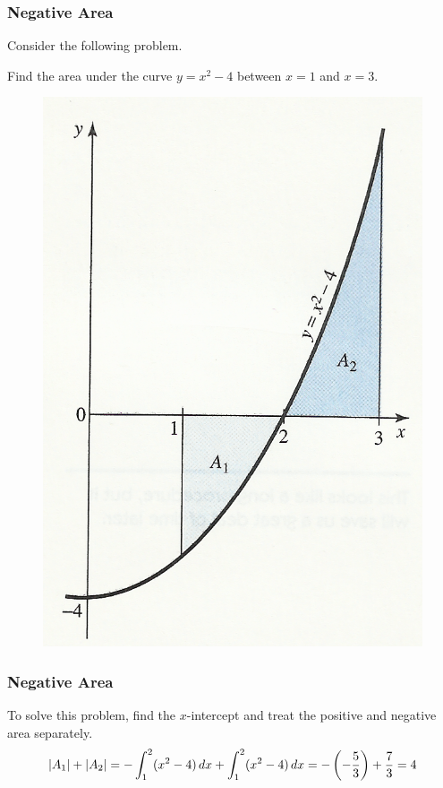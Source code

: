 \documentclass[xcolor=dvipsnames]{beamer}
\begin{document}
\begin{frame}
  \frametitle{Negative Area}
Consider the following problem.
\begin{block}{}
Find the area under the curve $y=x^{2}-4$ between $x=1$ and $x=3$.
\end{block}
\begin{figure}[h]
\includegraphics[scale=.6]{./negarea.png}
\end{figure}
\end{frame}

\begin{frame}
  \frametitle{Negative Area}
To solve this problem, find the $x$-intercept and treat the positive
and negative area separately. 
\begin{equation}
  \label{eq:aisohphu}
  \vert{}A_{1}\vert{}+\vert{}A_{2}\vert{}=-\int_{1}^{2}(x^{2}-4)\,dx+\int_{1}^{2}(x^{2}-4)\,dx=-\left(-\frac{5}{3}\right)+\frac{7}{3}=4\notag
\end{equation}
\end{frame}
\end{document}
